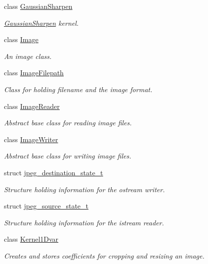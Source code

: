\begin{DoxyCompactItemize}
class \hyperlink{class_photo_finish_1_1_gaussian_sharpen}{Gaussian\+Sharpen}
\begin{DoxyCompactList}\small\item\em \hyperlink{class_photo_finish_1_1_gaussian_sharpen}{Gaussian\+Sharpen} kernel. \end{DoxyCompactList}\item 
class \hyperlink{class_photo_finish_1_1_image}{Image}
\begin{DoxyCompactList}\small\item\em An image class. \end{DoxyCompactList}\item 
class \hyperlink{class_photo_finish_1_1_image_filepath}{Image\+Filepath}
\begin{DoxyCompactList}\small\item\em Class for holding filename and the image format. \end{DoxyCompactList}\item 
class \hyperlink{class_photo_finish_1_1_image_reader}{Image\+Reader}
\begin{DoxyCompactList}\small\item\em Abstract base class for reading image files. \end{DoxyCompactList}\item 
class \hyperlink{class_photo_finish_1_1_image_writer}{Image\+Writer}
\begin{DoxyCompactList}\small\item\em Abstract base class for writing image files. \end{DoxyCompactList}\item 
struct \hyperlink{struct_photo_finish_1_1jpeg__destination__state__t}{jpeg\+\_\+destination\+\_\+state\+\_\+t}
\begin{DoxyCompactList}\small\item\em Structure holding information for the ostream writer. \end{DoxyCompactList}\item 
struct \hyperlink{struct_photo_finish_1_1jpeg__source__state__t}{jpeg\+\_\+source\+\_\+state\+\_\+t}
\begin{DoxyCompactList}\small\item\em Structure holding information for the istream reader. \end{DoxyCompactList}\item 
class \hyperlink{class_photo_finish_1_1_kernel1_dvar}{Kernel1\+Dvar}
\begin{DoxyCompactList}\small\item\em Creates and stores coefficients for cropping and resizing an image. \end{DoxyCompactList}\item 

\end{DoxyCompactItemize}
